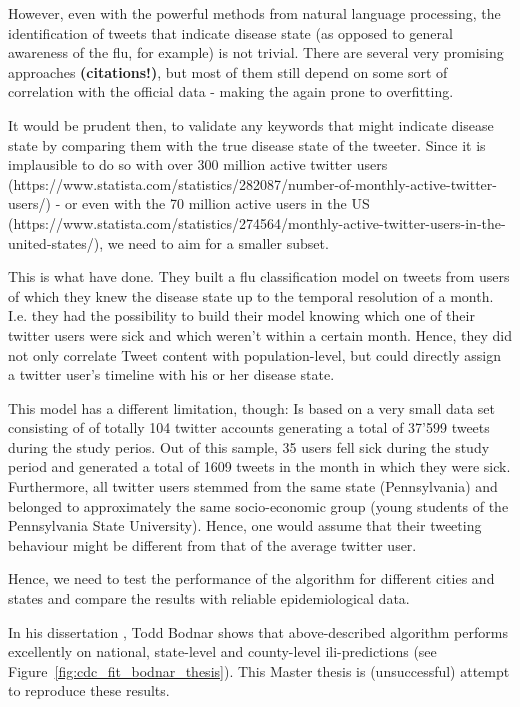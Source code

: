 \documentclass[11pt, a4paper]{article}\usepackage[]{graphicx}\usepackage[]{color}
\begin{document}
However, even with the powerful methods from natural language processing, the identification of tweets that indicate disease state (as opposed to general awareness of the flu, for example) is not trivial. There are several very promising approaches \textbf{(citations!)}, but most of them still depend on some sort of correlation with the official data - making the again prone to overfitting. \newline

It would be prudent then, to validate any keywords that might indicate disease state by comparing them with the true disease state of the tweeter. Since it is implausible to do so with over 300 million active twitter users (https://www.statista.com/statistics/282087/number-of-monthly-active-twitter-users/) - or even with the 70 million active users in the US (https://www.statista.com/statistics/274564/monthly-active-twitter-users-in-the-united-states/), we need to aim for a smaller subset.\newline

This is what \citep{bodnar_ground_2014} have done. They built a flu classification model on tweets from users of which they knew the disease state up to the temporal resolution of a month. I.e. they had the possibility to build their model knowing which one of their twitter users were sick and which weren't within a certain month. Hence, they did not only correlate Tweet content with population-level, but could directly assign a twitter user's timeline with his or her disease state.\newline

This model has a different limitation, though: Is based on a very small data set consisting of of totally 104 twitter accounts generating a total of 37’599 tweets during the study perios. Out of this sample, 35 users fell sick during the study period and generated a total of 1609 tweets in the month in which they were sick. Furthermore, all twitter users stemmed from the same state (Pennsylvania) and belonged to approximately the same socio-economic group (young students of the Pennsylvania State University). Hence, one would assume that their tweeting behaviour might be different from that of the average twitter user.\newline

Hence, we need to test the performance of the algorithm for different cities and states and compare the results with reliable epidemiological data.\newline

In his dissertation \citep{bodnar_data_2015}, Todd Bodnar shows that above-described algorithm performs excellently on national, state-level and county-level ili-predictions (see Figure~\ref{fig:cdc_fit_bodnar_thesis}). This Master thesis is (unsuccessful) attempt to reproduce these results. 
\end{document}
